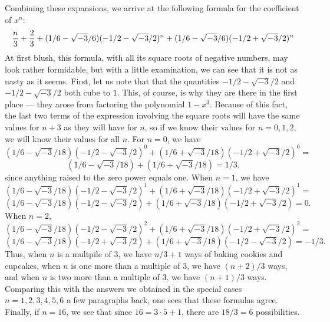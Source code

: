 \documentclass[12pt]{article}
\begin{document}
Combining these expansions, we arrive at the following formula for the coefficient of $x^n$:
 $${n \over 3} + {2 \over 3} + (1/6 - \sqrt{-3}/6) (-1/2 - \sqrt{-3}/2)^n + (1/6 - \sqrt{-3}/6) (-1/2 + \sqrt{-3}/2)^n$$
At first blush, this formula, with all its square roots of negative numbers, may look rather formidable, but with a little examination, we can see that it is not as nasty as it seems.  First, let us note that that the quantities $-1/2 - \sqrt{-3}/2$ and $-1/2 - \sqrt{-3}/2$ both cube to $1$.  This, of course, is why they are there in the first place --- they arose from factoring the polynomial $1 - x^3$.  Because of this fact, the last two terms of the expression involving the square roots will have the same values for $n+3$ as they will have for $n$, so if we know their values for $n = 0, 1, 2$, we will know their values for all $n$.  For $n=0$, we have
 $$(1/6 - \sqrt{-3}/18) (-1/2 - \sqrt{-3}/2)^0 + (1/6 + \sqrt{-3}/18) (-1/2 + \sqrt{-3}/2)^0 = $$
 $$(1/6 - \sqrt{-3}/18) + (1/6 + \sqrt{-3}/18) = 1/3.$$
since anything raised to the zero power equals one.  When $n = 1$, we have
 $$(1/6 - \sqrt{-3}/18) (-1/2 - \sqrt{-3}/2)^1 + (1/6 + \sqrt{-3}/18) (-1/2 + \sqrt{-3}/2)^1 = $$
 $$(1/6 - \sqrt{-3}/18) (-1/2 - \sqrt{-3}/2) + (1/6 + \sqrt{-3}/18) (-1/2 + \sqrt{-3}/2) = 0.$$
When $n = 2$,
 $$(1/6 - \sqrt{-3}/18) (-1/2 - \sqrt{-3}/2)^2 + (1/6 + \sqrt{-3}/18) (-1/2 + \sqrt{-3}/2)^2 = $$
 $$(1/6 - \sqrt{-3}/18) (-1/2 + \sqrt{-3}/2) + (1/6 + \sqrt{-3}/18) (-1/2 - \sqrt{-3}/2) = -1/3.$$
Thus, when $n$ is a multpile of 3, we have $n/3 + 1$ ways of baking cookies and cupcakes, when $n$ is one more than a multiple of $3$, we have $(n+2)/3$ ways, and when $n$ is two more than a multiple of $3$, we have $(n+1)/3$ ways.  Comparing this with the answers we obtained in the special cases $n = 1, 2, 3, 4, 5, 6$ a few paragraphs back, one sees that these formulas agree.  Finally, if $n = 16$, we see that since $16 = 3 \cdot 5 + 1$, there are $18/3 = 6$ possibilities.
\end{document}

